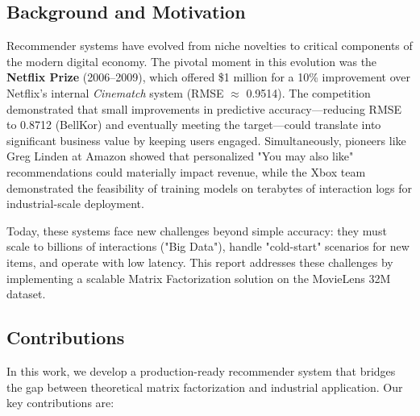 \documentclass{article}
\theoremstyle{plain}
\theoremstyle{definition}
\theoremstyle{remark}
\begin{document}

\subsection{Background and Motivation}

Recommender systems have evolved from niche novelties to critical components of the modern digital economy. The pivotal moment in this evolution was the \textbf{Netflix Prize} (2006--2009), which offered \$1 million for a 10\% improvement over Netflix's internal \textit{Cinematch} system (RMSE $\approx$ 0.9514). The competition demonstrated that small improvements in predictive accuracy---reducing RMSE to 0.8712 (BellKor) and eventually meeting the target---could translate into significant business value by keeping users engaged. Simultaneously, pioneers like Greg Linden at Amazon showed that personalized "You may also like" recommendations could materially impact revenue, while the Xbox team demonstrated the feasibility of training models on terabytes of interaction logs for industrial-scale deployment.

Today, these systems face new challenges beyond simple accuracy: they must scale to billions of interactions ("Big Data"), handle "cold-start" scenarios for new items, and operate with low latency. This report addresses these challenges by implementing a scalable Matrix Factorization solution on the MovieLens 32M dataset.

\subsection{Contributions}
In this work, we develop a production-ready recommender system that bridges the gap between theoretical matrix factorization and industrial application. Our key contributions are:
\end{document}
